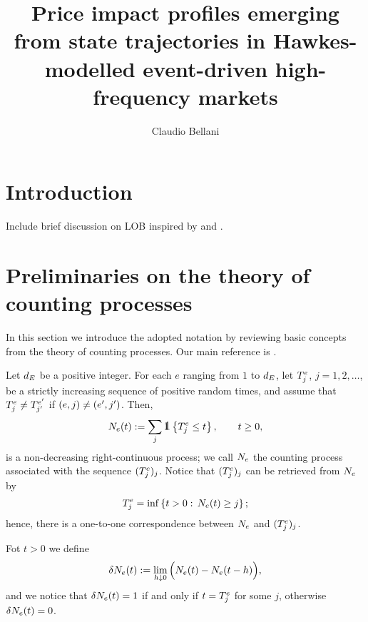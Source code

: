 \documentclass[10pt]{article}
\title{Price impact profiles emerging from state trajectories in Hawkes-modelled event-driven high-frequency markets}
\author{Claudio Bellani}
\begin{document}
 
\maketitle
\tableofcontents

\section{Introduction}
Include brief discussion on LOB inspired by \citealp[Chapter 6]{FPR13mar} and \citealp{GPWMFH13lim}.
\section{Preliminaries on the theory of counting processes} 
In this section we introduce the adopted notation by reviewing basic concepts from the theory of counting processes. Our main reference is \citealp[Chapter 14]{DVJ08int}.

Let $\numEventTypes$ be a positive integer. For each $e$ ranging from $1$ to $\numEventTypes$, let $\arrivalTimes_{j}$, $j=1, 2, \dots$, be a strictly increasing sequence of positive random times, and assume that $\arrivalTimes_{j}\neq\arrivalTimes[e\derivative]_{j\derivative}$ if $(e,j)\neq (e\derivative,j\derivative)$. Then, 
\begin{equation*}
 \countingProc(t):= \sum_{j} \one\left\lbrace\arrivalTimes_{j}\leq t \right\rbrace, \qquad t\geq 0,
\end{equation*}
is a non-decreasing right-continuous process; we call $\countingProc$ the counting process associated with the sequence $(\arrivalTimes_{j})_j$. Notice that $(\arrivalTimes_{j})_j$ can be retrieved from $\countingProc$ by 
\begin{equation*}
 \arrivalTimes_{j} = \inf \left\lbrace t>0: \, \countingProc(t)\geq j\right\rbrace;
\end{equation*}
hence, there is a one-to-one correspondence between $\countingProc$ and $(\arrivalTimes_{j})_j$. 

Fot $t>0$ we define 
\begin{equation*}
 \delta\countingProc(t):= \lim_{h\downarrow 0} \Big( \countingProc(t) - \countingProc(t-h) \Big),
\end{equation*}
and we notice that $\delta \countingProc(t) = 1$ if and only if $t=\arrivalTimes_{j}$ for some $j$, otherwise $\delta \countingProc(t) = 0$.
\end{document}
